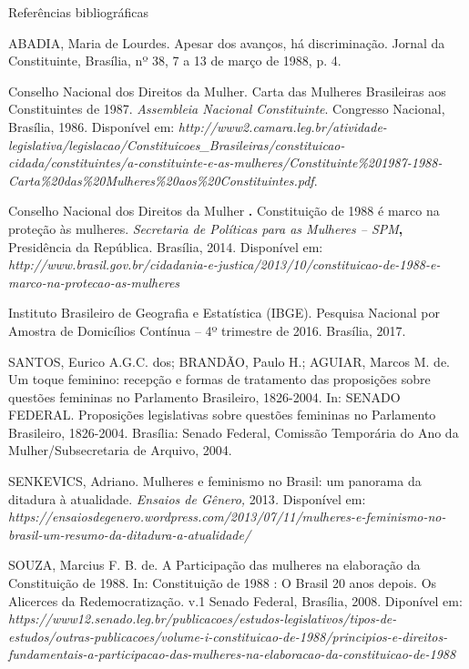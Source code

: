 Referências bibliográficas

ABADIA, Maria de Lourdes. Apesar dos avanços, há discriminação. Jornal
da Constituinte, Brasília, nº 38, 7 a 13 de março de 1988, p. 4.

Conselho Nacional dos Direitos da Mulher. Carta das Mulheres Brasileiras
aos Constituintes de 1987. \emph{Assembleia Nacional Constituinte}.
Congresso Nacional, Brasília, 1986. Disponível em:
\emph{http://www2.camara.leg.br/atividade-legislativa/legislacao/Constituicoes\_Brasileiras/constituicao-cidada/constituintes/a-constituinte-e-as-mulheres/Constituinte\%201987-1988-Carta\%20das\%20Mulheres\%20aos\%20Constituintes.pdf}.

Conselho Nacional dos Direitos da Mulher \textbf{.} Constituição de 1988
é marco na proteção às mulheres. \emph{Secretaria de Políticas para as
Mulheres -- SPM}\textbf{,} Presidência da República. Brasília, 2014.
Disponível em:
\emph{http://www.brasil.gov.br/cidadania-e-justica/2013/10/constituicao-de-1988-e-marco-na-protecao-as-mulheres}

Instituto Brasileiro de Geografia e Estatística (IBGE). Pesquisa
Nacional por Amostra de Domicílios Contínua -- 4º trimestre de 2016.
Brasília, 2017.

SANTOS, Eurico A.G.C. dos; BRANDÃO, Paulo H.; AGUIAR, Marcos M. de. Um
toque feminino: recepção e formas de tratamento das proposições sobre
questões femininas no Parlamento Brasileiro, 1826-2004. In: SENADO
FEDERAL. Proposições legislativas sobre questões femininas no Parlamento
Brasileiro, 1826-2004. Brasília: Senado Federal, Comissão Temporária do
Ano da Mulher/Subsecretaria de Arquivo, 2004.

SENKEVICS, Adriano. Mulheres e feminismo no Brasil: um panorama da
ditadura à atualidade. \emph{Ensaios de Gênero,} 2013\emph{.} Disponível
em: \emph{https://ensaiosdegenero.wordpress.com/2013/07/11/mulheres-e-feminismo-no-brasil-um-resumo-da-ditadura-a-atualidade/}

SOUZA, Marcius F. B. de. A Participação das mulheres na elaboração da
Constituição de 1988. In: Constituição de 1988 : O Brasil 20 anos
depois. Os Alicerces da Redemocratização. v.1 Senado Federal, Brasília,
2008. Diponível em: \emph{https://www12.senado.leg.br/publicacoes/estudos-legislativos/tipos-de-estudos/outras-publicacoes/volume-i-constituicao-de-1988/principios-e-direitos-fundamentais-a-participacao-das-mulheres-na-elaboracao-da-constituicao-de-1988}
